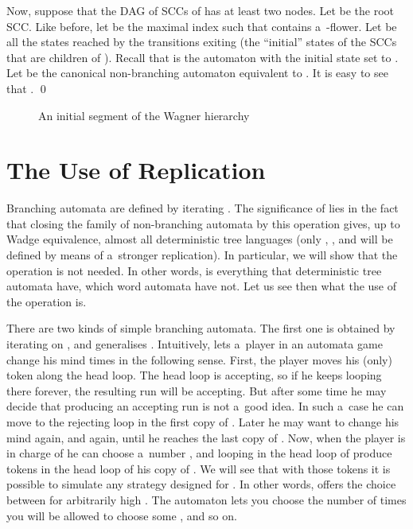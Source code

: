 \documentclass{LMCS}
\begin{document}
Now, suppose that the DAG of SCCs of  has at least two nodes. Let
 be the root SCC. Like before, let  be the maximal index such that  contains a~-flower. Let  be all the states reached by the transitions exiting  (the ``initial'' states of the SCCs that are children of ). Recall that  is the automaton  with the initial state set to . Let  be the canonical non-branching automaton equivalent to . It is easy to see that . \qed



\begin{figure}
\centering
{\footnotesize {\setlength\arraycolsep{1pt}
}}

\caption{An initial segment of the Wagner hierarchy}
\label{fig:wagnerhierarchy}
\end{figure}


\section{The Use of Replication} \label{theuseofreplication}

Branching automata are defined by iterating . The significance of  lies in the fact that closing the family of non-branching automata by this operation gives, up to Wadge equivalence, almost all deterministic tree languages (only , , and  will be defined by means of a~stronger replication). In particular, we will show that the operation  is not needed. In other words,  is everything that deterministic tree automata have, which word automata have not. Let us see then what the use of the operation  is.

There are two kinds of simple branching automata. The first one is obtained by iterating  on , and generalises . Intuitively,  lets a~player in an automata game change his mind  times in the following sense. First, the player moves his (only) token along the head loop. The head loop is accepting, so if he keeps looping there forever, the resulting run will be accepting. But after some time he may decide that producing an accepting run is not a~good idea. In such a~case he can move to the rejecting loop in the first copy of . Later he may want to change his mind again, and again, until he reaches the last copy of . Now, when the player is in charge of  he can choose a~number , and looping in the head loop of  produce  tokens in the head loop of his copy of . We will see that with those tokens it is possible to simulate any strategy designed for . In other words,  offers the choice between  for arbitrarily high . The automaton  lets you choose the number of times you will be allowed to choose some , and so on. 
\end{document}
